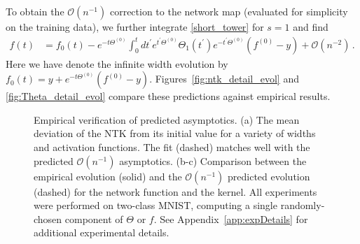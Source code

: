 \documentclass[english]{article}
\newcommand{\cO}{\ensuremath{\mathcal{O}}}
\newcommand{\es}[2] {\begin{align} \label{#1} #2 \end{align}}
\begin{document}
To obtain the $\cO(n^{-1})$ correction to the network map (evaluated for simplicity on the training data), we further integrate \eqref{short_tower} for $s=1$ and find
\es{eq:NLO_expressions}{
    f(t) &= f_{0}(t)
    -e^{-t\Theta^{(0)}} \int_{0}^{t} dt^{\prime} e^{t^{\prime} \Theta^{(0)}} 
    \Theta_{1}
    (t^{\prime})  e^{-t^{\prime} \Theta^{(0)}} (f^{(0)}-y)+\mathcal{O}(n^{-2})\,.
  }
Here we have denote the infinite width evolution by $f_{0}(t) = y + e^{-t\Theta^{(0)}} (f^{(0)} - y)$. Figures~\ref{fig:ntk_detail_evol} and \ref{fig:Theta_detail_evol} compare these predictions against empirical results.


\begin{figure}[ht!]
    \centering
    \hspace{-1.5em}
    \hspace{-1.5em}
    \caption{Empirical verification of predicted asymptotics. 
      (a) The mean deviation of the NTK from its initial value for a variety of widths and activation functions. The fit (dashed) matches well with the predicted $\cO(n^{-1})$ asymptotics.
      (b-c) Comparison between the empirical evolution (solid) and the $\mathcal{O}(n^{-1})$ predicted evolution (dashed) for the network function and the kernel.
      All experiments were performed on two-class MNIST, computing a single randomly-chosen component of $\Theta$ or $f$.
      See Appendix~\ref{app:expDetails} for additional experimental details.
    }
    \label{fig:experiments}
\end{figure}
\end{document}

